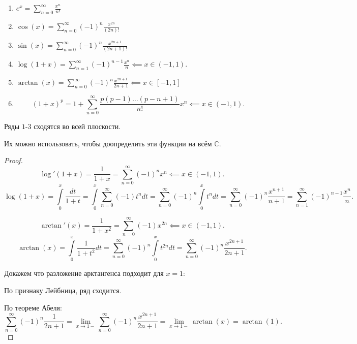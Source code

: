 \begin{theorem} \thmslashn

    \begin{enumerate}
        \item $e^{x} = \sum\limits_{n=0}^{\infty} \frac{x^{n}}{n!}$
        \item $\cos(x) = \sum\limits_{n=0}^{\infty} (-1)^{n} \frac{x^{2n}}{(2n)!}$
        \item $\sin(x) = \sum\limits_{n=0}^{\infty} (-1)^{n} \frac{x^{2n+1}}{(2n+1)!}$
        \item $\log(1+x) = \sum\limits_{n=1}^{\infty} (-1)^{n-1} \frac{x^{n}}{n} \impliedby x\in (-1, 1)$.
        \item $\arctan(x) = \sum\limits_{n=0}^{\infty} (-1)^{n} \frac{x^{2n+1}}{2n+1} \impliedby x\in [-1, 1]$
        \item \[ (1+x)^{p} = 1 + \sum\limits_{n=0}^{\infty} \frac{p(p-1) \ldots (p-n+1)}{n!} x^{n} \impliedby x\in (-1, 1) .\] 
    \end{enumerate}

    Ряды $1$-$3$ сходятся во всей плоскости.

    Их можно использовать, чтобы доопределить эти функции на всём $\mathbb{C}$.
    \begin{proof} \thmslashn
    
        \[ \log'(1+x) = \frac{1}{1+x} = \sum\limits_{n=0}^{\infty} (-1)^{n}x^{n} \impliedby x \in (-1, 1) .\]
        \[ \log(1+x) = \int\limits_{0}^{x} \frac{dt}{1+t} = \int\limits_{0}^{x} \sum\limits_{n=0}^{\infty} (-1)t^{n}dt = \sum\limits_{n=0}^{\infty} (-1)^{n} \int\limits_{0}^{x} t^ndt = \sum\limits_{n=0}^{\infty} (-1)^{n} \frac{x^{n+1}}{n+1} = \sum\limits_{n=1}^{\infty} (-1)^{n-1} \frac{x^{n}}{n}     .\]

        \[ \arctan'(x) = \frac{1}{1+x^2} = \sum\limits_{n=0}^{\infty} (-1)x^{2n} \impliedby x\in (-1, 1) .\]
        \[ \arctan(x) = \int\limits_{0}^{x} \frac{1}{1+t^2}dt = \sum\limits_{n=0}^{\infty} (-1)^{n} \int\limits_{0}^{x} t^{2n}dt = \sum\limits_{n=0}^{\infty} (-1)^{n} \frac{x^{2n+1}}{2n+1}   .\]

        Докажем что разложение арктангенса подходит для $x=1$:

        По признаку Лейбница, ряд сходится.

        По теореме Абеля:
        \[ \sum\limits_{n=0}^{\infty} (-1)^{n} \frac{1}{2n+1} = \lim\limits_{x \to 1-} \sum\limits_{n=0}^{\infty} (-1)^{n} \frac{x^{2n+1}}{2n+1} = \lim\limits_{x \to 1-} \arctan(x) = \arctan(1) .\]


\end{proof}
\end{theorem}
